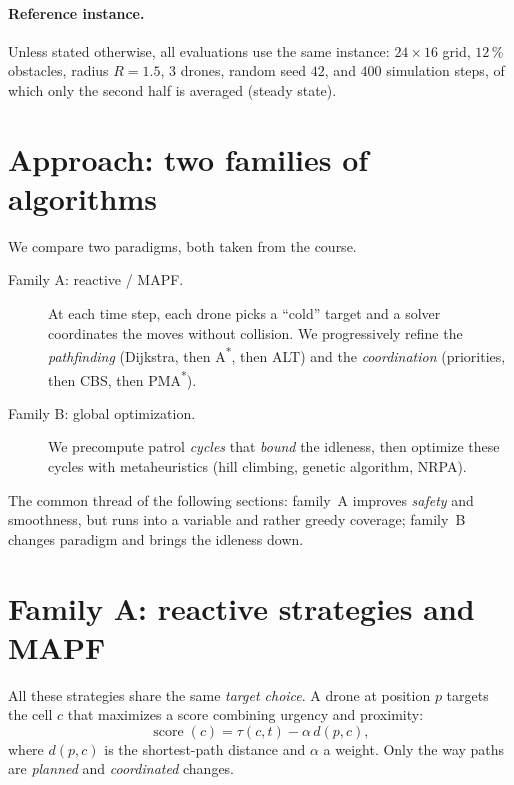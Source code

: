 \documentclass[11pt,a4paper]{article}
\begin{document}
\paragraph{Reference instance.} Unless stated otherwise, all evaluations use
the same instance: $24\times16$ grid, $12\,\%$ obstacles, radius $R=1.5$, $3$
drones, random seed $42$, and $400$ simulation steps, of which only the second
half is averaged (steady state).

\section{Approach: two families of algorithms}

We compare two paradigms, both taken from the course.

\begin{description}
  \item[Family A: reactive / MAPF.] At each time step, each drone picks a
  ``cold'' target and a solver coordinates the moves without collision. We
  progressively refine the \emph{pathfinding} (Dijkstra, then
  A\textsuperscript{*}, then ALT) and the \emph{coordination} (priorities, then
  CBS, then PMA\textsuperscript{*}).
  \item[Family B: global optimization.] We precompute patrol \emph{cycles} that
  \emph{bound} the idleness, then optimize these cycles with metaheuristics (hill
  climbing, genetic algorithm, NRPA).
\end{description}

The common thread of the following sections: family~A improves
\emph{safety} and smoothness, but runs into a variable and rather greedy
coverage; family~B changes paradigm and brings the idleness down.

\section{Family A: reactive strategies and MAPF}

All these strategies share the same \emph{target choice}. A drone at position
$p$ targets the cell $c$ that maximizes a score combining urgency and proximity:
\begin{equation}
  \operatorname{score}(c) = \tau(c,t) - \alpha \, d(p, c),
  \label{eq:score}
\end{equation}
where $d(p,c)$ is the shortest-path distance and $\alpha$ a weight. Only the way
paths are \emph{planned} and \emph{coordinated} changes.
\end{document}
